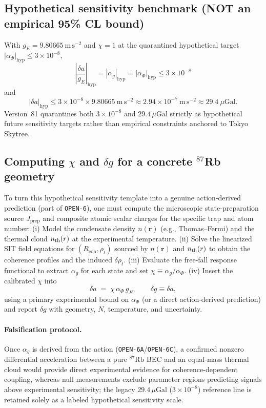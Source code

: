 \subsection{Hypothetical sensitivity benchmark (NOT an empirical 95\% CL bound)}
With $g_E=9.80665~\mathrm{m\,s^{-2}}$ and $\chi=1$ at the quarantined hypothetical target $|\alpha_\Phi|_{\mathrm{hyp}} \le 3\times 10^{-8}$,
\[
\boxed{\;
\left|\frac{\delta a}{g_E}\right|_{\mathrm{hyp}}
= |\alpha_g|_{\mathrm{hyp}}
= |\alpha_\Phi|_{\mathrm{hyp}}
\le 3\times10^{-8}
\;}
\]
and
\[
\boxed{\;
|\delta a|_{\mathrm{hyp}}
\le 3\times10^{-8}\times 9.80665~\mathrm{m\,s^{-2}}
\approx 2.94\times10^{-7}~\mathrm{m\,s^{-2}}
\approx 29.4~\mu\mathrm{Gal}.
\;}
\]
Version~81 quarantines both $3\times 10^{-8}$ and $29.4\,\mu\mathrm{Gal}$ strictly as hypothetical future sensitivity targets rather than empirical constraints anchored to Tokyo Skytree.

\subsection{Computing $\chi$ and $\delta g$ for a concrete $^{87}$Rb geometry}
To turn this hypothetical sensitivity template into a genuine action-derived prediction (part of \texttt{OPEN-6}), one must compute the microscopic state-preparation source $J_{\mathrm{prep}}$ and composite atomic scalar charges for the specific trap and atom number:
(i) Model the condensate density $n(\mathbf{r})$ (e.g., Thomas--Fermi) and the thermal cloud $n_{\rm th}(\mathbf{r})$ at the experimental temperature.
(ii) Solve the linearized SIT field equations for $(R_{\mathrm{coh}},\rho_t)$ sourced by $n(\mathbf{r})$ and $n_{\rm th}(\mathbf{r})$ to obtain the coherence profiles and the induced $\delta\rho_t$.
(iii) Evaluate the free-fall response functional to extract $\alpha_g$ for each state and set $\chi \equiv \alpha_g/\alpha_\Phi$.
(iv) Insert the calibrated $\chi$ into
\[
\delta a \;=\; \chi\,\alpha_\Phi\,g_E,\qquad
\delta g \equiv \delta a,
\]
using a primary experimental bound on $\alpha_\Phi$ (or a direct action-derived prediction) and report $\delta g$ with geometry, $N$, temperature, and uncertainty.

\paragraph{Falsification protocol.}
Once $\alpha_g$ is derived from the action (\texttt{OPEN-6A}/\texttt{OPEN-6C}), a confirmed nonzero differential acceleration between a pure $^{87}\mathrm{Rb}$ BEC and an equal-mass thermal cloud would provide direct experimental evidence for coherence-dependent coupling, whereas null measurements exclude parameter regions predicting signals above experimental sensitivity; the legacy $29.4\,\mu\mathrm{Gal}$ ($3\times 10^{-8}$) reference line is retained solely as a labeled hypothetical sensitivity scale.

